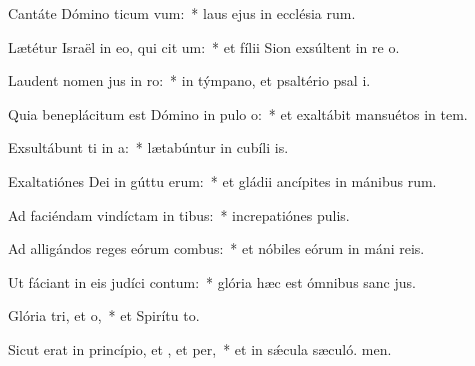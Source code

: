 \item Cantáte Dómino ticum vum:~* laus ejus in ecclésia rum.
\item Lætétur Israël in eo, qui cit um:~* et fílii Sion exsúltent in re o.
\item Laudent nomen jus in ro:~* in týmpano, et psaltério psal i.
\item Quia beneplácitum est Dómino in pulo o:~* et exaltábit mansuétos in tem.
\item Exsultábunt ti in a:~* lætabúntur in cubíli is.
\item Exaltatiónes Dei in gúttu erum:~* et gládii ancípites in mánibus rum.
\item Ad faciéndam vindíctam in tibus:~* increpatiónes  pulis.
\item Ad alligándos reges eórum  combus:~* et nóbiles eórum in máni reis.
\item Ut fáciant in eis judíci contum:~* glória hæc est ómnibus sanc jus.
\item Glória tri, et o,~* et Spirítu to.
\item Sicut erat in princípio, et , et per,~* et in sǽcula sæculó. men.
